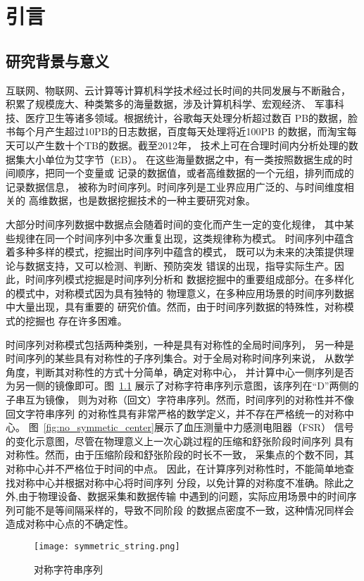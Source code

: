 
\chapter{引言}

\section{研究背景与意义}
互联网、物联网、云计算等计算机科学技术经过长时间的共同发展与不断融合，
积累了规模庞大、种类繁多的海量数据，涉及计算机科学、宏观经济、
军事科技、医疗卫生等诸多领域。根据统计，谷歌每天处理分析超过数百
PB的数据，脸书每个月产生超过10PB的日志数据，百度每天处理将近100PB
的数据，而淘宝每天可以产生数十个TB的数据。截至2012年，
技术上可在合理时间内分析处理的数据集大小单位为艾字节（EB）。
在这些海量数据之中，有一类按照数据生成的时间顺序，把同一个变量或
记录的数据值，或者高维数据的一个元组，排列而成的记录数据信息，
被称为时间序列。时间序列是工业界应用广泛的、与时间维度相关的
高维数据，也是数据挖掘技术的一种主要研究对象。

大部分时间序列数据中数据点会随着时间的变化而产生一定的变化规律，
其中某些规律在同一个时间序列中多次重复出现，这类规律称为模式。
时间序列中蕴含着多种多样的模式，挖掘出时间序列中蕴含的模式，
既可以为未来的决策提供理论与数据支持，又可以检测、判断、预防突发
错误的出现，指导实际生产。因此，时间序列模式挖掘是时间序列分析和
数据挖掘中的重要组成部分。在多样化的模式中，对称模式因为具有独特的
物理意义，在多种应用场景的时间序列数据中大量出现，具有重要的
研究价值。然而，由于时间序列数据的特殊性，对称模式的挖掘也
存在许多困难。

时间序列对称模式包括两种类别，一种是具有对称性的全局时间序列，
另一种是时间序列的某些具有对称性的子序列集合。对于全局对称时间序列来说，
从数学角度，判断其对称性的方式十分简单，确定对称中心，
并计算中心一侧序列是否为另一侧的镜像即可。图~\ref{fig:symmetric_string}
展示了对称字符串序列示意图，该序列在“D”两侧的子串互为镜像，
则为对称（回文）字符串序列。然而，时间序列的对称性并不像回文字符串序列
的对称性具有非常严格的数学定义，并不存在严格统一的对称中心。
图~\ref{fig:no_symmetic_center}展示了血压测量中力感测电阻器（FSR）
信号的变化示意图，尽管在物理意义上一次心跳过程的压缩和舒张阶段时间序列
具有对称性。然而，由于压缩阶段和舒张阶段的时长不一致，
采集点的个数不同，其对称中心并不严格位于时间的中点。
因此，在计算序列对称性时，不能简单地查找对称中心并根据对称中心将时间序列
分段，以免计算的对称度不准确。除此之外,由于物理设备、数据采集和数据传输
中遇到的问题，实际应用场景中的时间序列可能不是等间隔采样的，导致不同阶段
的数据点密度不一致，这种情况同样会造成对称中心点的不确定性。
\begin{figure}[t]
  \centering
  \texttt{[image: symmetric\_string.png]}
  \caption{对称字符串序列}
  \label{fig:symmetric_string}
\end{figure}


